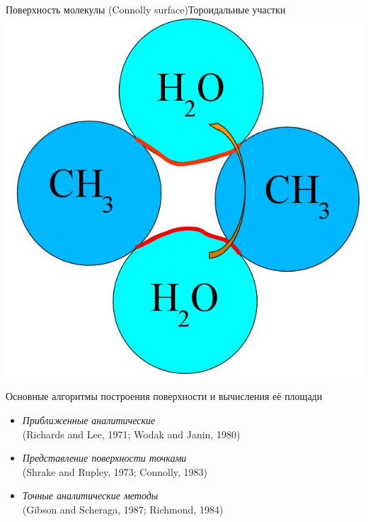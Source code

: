 \documentclass{beamer}
\begin{document}
    \begin{frame}{Поверхность молекулы (Connolly surface)}{Тороидальные участки}
        \includegraphics[height=0.7\textheight]{connolly-2-points.jpg}
    \end{frame}

    \begin{frame}{Основные алгоритмы построения поверхности и вычисления её площади}
        \begin{itemize}
        \item \emph{Приближенные аналитические} \\
            (Richards and Lee, 1971; Wodak and Janin, 1980)
        \item \emph{Представление поверхности точками} \\
            (Shrake and Rupley, 1973; Connolly, 1983)
        \item \emph{Точные аналитические методы} \\
            (Gibson and Scheraga, 1987;  Richmond, 1984)
        \end{itemize}
    \end{frame}
\end{document}
